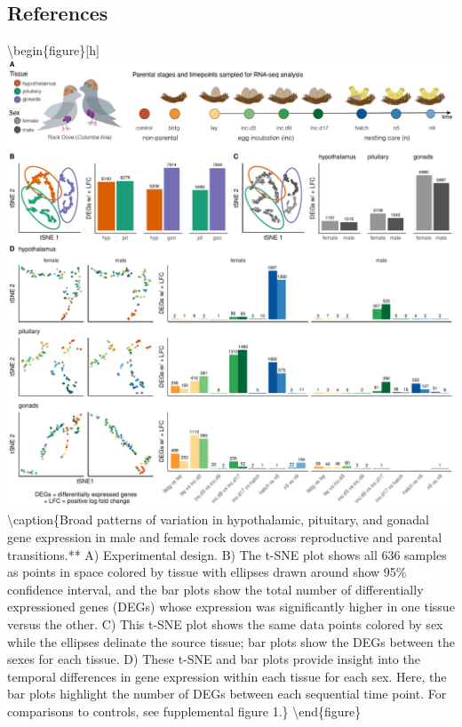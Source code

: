 \hypertarget{references}{%
\subsection{References}\label{references}}



\newpage

\textbackslash{}begin\{figure\}{[}h{]} \centering
\includegraphics[width=1.0\textwidth]{../../figures/fig1-1}
\textbackslash{}caption\{Broad patterns of variation in hypothalamic,
pituitary, and gonadal gene expression in male and female rock doves
across reproductive and parental transitions.** A) Experimental design.
B) The t-SNE plot shows all 636 samples as points in space colored by
tissue with ellipses drawn around show 95\% confidence interval, and the
bar plots show the total number of differentially expressioned genes
(DEGs) whose expression was significantly higher in one tissue versus
the other. C) This t-SNE plot shows the same data points colored by sex
while the ellipses delinate the source tissue; bar plots show the DEGs
between the sexes for each tissue. D) These t-SNE and bar plots provide
insight into the temporal differences in gene expression within each
tissue for each sex. Here, the bar plots highlight the number of DEGs
between each sequential time point. For comparisons to controls, see
fupplemental figure 1.\} \label{figure:fig1}
\textbackslash{}end\{figure\}

